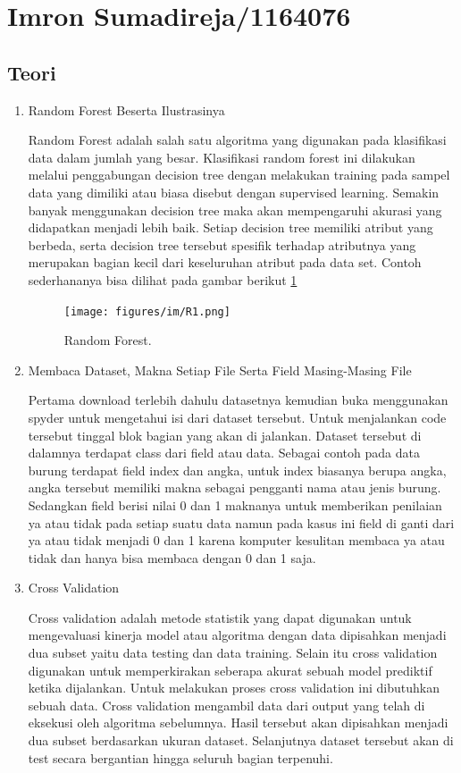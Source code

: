 \section{Imron Sumadireja/1164076}
\subsection{Teori}
\begin{enumerate}
\item Random Forest Beserta Ilustrasinya \par
Random Forest adalah salah satu algoritma yang digunakan pada klasifikasi data dalam jumlah yang besar. Klasifikasi random forest ini dilakukan melalui penggabungan decision tree dengan melakukan training pada sampel data yang dimiliki atau biasa disebut dengan supervised learning. Semakin banyak menggunakan decision tree maka akan mempengaruhi akurasi yang didapatkan menjadi lebih baik. Setiap decision tree memiliki atribut yang berbeda, serta decision tree tersebut spesifik terhadap atributnya yang merupakan bagian kecil dari keseluruhan atribut pada data set. Contoh sederhananya bisa dilihat pada gambar berikut \ref{R1}
		\begin{figure}[ht]
		\centerline{\texttt{[image: figures/im/R1.png]}}
		\caption{Random Forest.}
		\label{R1}
		\end{figure}

\item Membaca Dataset, Makna Setiap File Serta Field Masing-Masing File\par
Pertama download terlebih dahulu datasetnya kemudian buka menggunakan spyder untuk mengetahui isi dari dataset tersebut. Untuk menjalankan code tersebut tinggal blok bagian yang akan di jalankan. Dataset tersebut di dalamnya terdapat class dari field atau data. Sebagai contoh pada data burung terdapat field index dan angka, untuk index biasanya berupa angka, angka tersebut memiliki makna sebagai pengganti nama atau jenis burung. Sedangkan field berisi nilai 0 dan 1 maknanya untuk memberikan penilaian ya atau tidak pada setiap suatu data namun pada kasus ini field di ganti dari ya atau tidak menjadi 0 dan 1 karena komputer kesulitan membaca ya atau tidak dan hanya bisa membaca dengan 0 dan 1 saja.

\item Cross Validation \par
Cross validation adalah metode statistik yang dapat digunakan untuk mengevaluasi kinerja model atau algoritma dengan data dipisahkan menjadi dua subset yaitu data testing dan data training. Selain itu cross validation digunakan untuk memperkirakan seberapa akurat sebuah model prediktif ketika dijalankan. Untuk melakukan proses cross validation ini dibutuhkan sebuah data. Cross validation mengambil data dari output yang telah di eksekusi oleh algoritma sebelumnya. Hasil tersebut akan dipisahkan menjadi dua subset berdasarkan ukuran dataset. Selanjutnya dataset tersebut akan di test secara bergantian hingga seluruh bagian terpenuhi.


\end{enumerate}
